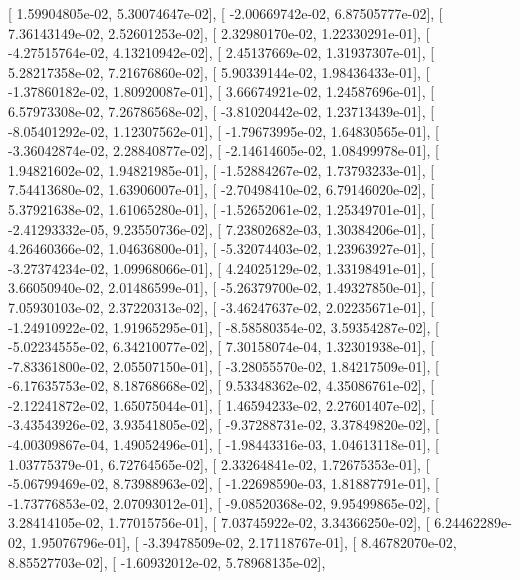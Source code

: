 \documentclass{article}
\begin{document}
       [  1.59904805e-02,   5.30074647e-02],
       [ -2.00669742e-02,   6.87505777e-02],
       [  7.36143149e-02,   2.52601253e-02],
       [  2.32980170e-02,   1.22330291e-01],
       [ -4.27515764e-02,   4.13210942e-02],
       [  2.45137669e-02,   1.31937307e-01],
       [  5.28217358e-02,   7.21676860e-02],
       [  5.90339144e-02,   1.98436433e-01],
       [ -1.37860182e-02,   1.80920087e-01],
       [  3.66674921e-02,   1.24587696e-01],
       [  6.57973308e-02,   7.26786568e-02],
       [ -3.81020442e-02,   1.23713439e-01],
       [ -8.05401292e-02,   1.12307562e-01],
       [ -1.79673995e-02,   1.64830565e-01],
       [ -3.36042874e-02,   2.28840877e-02],
       [ -2.14614605e-02,   1.08499978e-01],
       [  1.94821602e-02,   1.94821985e-01],
       [ -1.52884267e-02,   1.73793233e-01],
       [  7.54413680e-02,   1.63906007e-01],
       [ -2.70498410e-02,   6.79146020e-02],
       [  5.37921638e-02,   1.61065280e-01],
       [ -1.52652061e-02,   1.25349701e-01],
       [ -2.41293332e-05,   9.23550736e-02],
       [  7.23802682e-03,   1.30384206e-01],
       [  4.26460366e-02,   1.04636800e-01],
       [ -5.32074403e-02,   1.23963927e-01],
       [ -3.27374234e-02,   1.09968066e-01],
       [  4.24025129e-02,   1.33198491e-01],
       [  3.66050940e-02,   2.01486599e-01],
       [ -5.26379700e-02,   1.49327850e-01],
       [  7.05930103e-02,   2.37220313e-02],
       [ -3.46247637e-02,   2.02235671e-01],
       [ -1.24910922e-02,   1.91965295e-01],
       [ -8.58580354e-02,   3.59354287e-02],
       [ -5.02234555e-02,   6.34210077e-02],
       [  7.30158074e-04,   1.32301938e-01],
       [ -7.83361800e-02,   2.05507150e-01],
       [ -3.28055570e-02,   1.84217509e-01],
       [ -6.17635753e-02,   8.18768668e-02],
       [  9.53348362e-02,   4.35086761e-02],
       [ -2.12241872e-02,   1.65075044e-01],
       [  1.46594233e-02,   2.27601407e-02],
       [ -3.43543926e-02,   3.93541805e-02],
       [ -9.37288731e-02,   3.37849820e-02],
       [ -4.00309867e-04,   1.49052496e-01],
       [ -1.98443316e-03,   1.04613118e-01],
       [  1.03775379e-01,   6.72764565e-02],
       [  2.33264841e-02,   1.72675353e-01],
       [ -5.06799469e-02,   8.73988963e-02],
       [ -1.22698590e-03,   1.81887791e-01],
       [ -1.73776853e-02,   2.07093012e-01],
       [ -9.08520368e-02,   9.95499865e-02],
       [  3.28414105e-02,   1.77015756e-01],
       [  7.03745922e-02,   3.34366250e-02],
       [  6.24462289e-02,   1.95076796e-01],
       [ -3.39478509e-02,   2.17118767e-01],
       [  8.46782070e-02,   8.85527703e-02],
       [ -1.60932012e-02,   5.78968135e-02],
\end{document}
